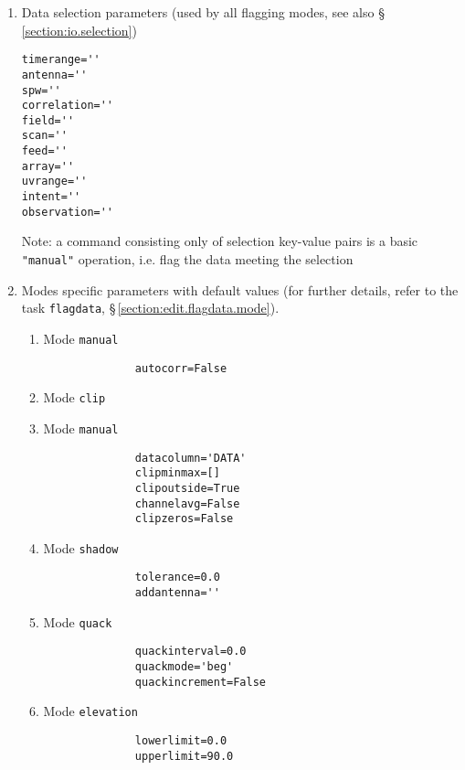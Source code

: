 \begin{enumerate}
        
\item Data selection parameters (used by all flagging modes, see also \S\,\ref{section:io.selection}) 

\small
\begin{verbatim}        
timerange='' 
antenna='' 
spw='' 
correlation='' 
field='' 
scan='' 
feed=''
array='' 
uvrange='' 
intent='' 
observation=''
\end{verbatim}
\normalsize
        

Note: a command consisting only of selection key-value pairs is a
basic {\tt "manual"} operation, i.e. flag the data meeting the selection
          
        
\item Modes specific parameters with default values (for further details,
refer to the task {\tt flagdata}, \S\,\ref{section:edit.flagdata.mode}).
     
\begin{enumerate}
     
\item Mode {\tt manual}
\small
\begin{verbatim}
              autocorr=False
\end{verbatim}
\normalsize

\item Mode {\tt clip}
     
\item Mode {\tt manual}
\small
\begin{verbatim}
              datacolumn='DATA'
              clipminmax=[]  
              clipoutside=True
              channelavg=False  
              clipzeros=False
\end{verbatim}
\normalsize             

\item Mode {\tt shadow}
\small
\begin{verbatim}
              tolerance=0.0
              addantenna=''
\end{verbatim}
\normalsize  

\item Mode {\tt quack}
\small
\begin{verbatim}
              quackinterval=0.0     
              quackmode='beg' 
              quackincrement=False
\end{verbatim}
\normalsize  
              
\item Mode {\tt elevation}
\small
\begin{verbatim}
              lowerlimit=0.0
              upperlimit=90.0
\end{verbatim}
\normalsize  
              

\end{enumerate}
\end{enumerate}
